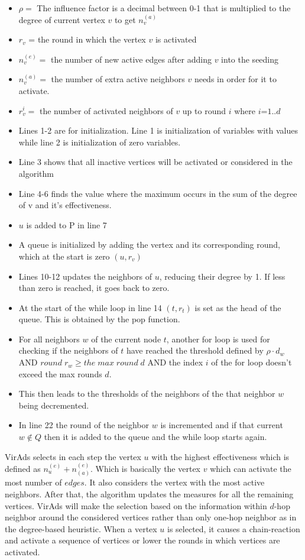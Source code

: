 \begin{itemize}
	\item $\rho =$ The influence factor is a decimal between 0-1 that is multiplied to the degree of current vertex $v$ to get $n_{v}^{(a)}$
	\item $r_{v}$ = the round in which the vertex $v$ is activated
	\item $n_{v}^{(e)}=$ the number of new active edges after adding $v$ into the seeding
	\item $n_{v}^{(a)}=$ the number of extra active neighbors $v$ needs in order for it to activate.
	\item $r_{v}^{i}=$ the number of activated neighbors of $v$ up to round $i$ where $i$=$1..d$
	\item Lines 1-2 are for initialization. Line 1 is initialization of variables with values while line 2 is initialization of zero variables.
	\item Line 3 shows that all inactive vertices will be activated or considered in the algorithm
	\item Line 4-6 finds the value where the maximum occurs in the sum of the degree of v and it's effectiveness.
	\item $u$ is added to P in line 7
	\item A queue is initialized by adding the vertex and its corresponding round, which at the start is zero $(u,r_{v})$
	\item Lines 10-12 updates the neighbors of $u$, reducing their degree by 1. If less than zero is reached, it goes back to zero.
	\item At the start of the while loop in line 14 $(t,r_{t})$ is set as the head of the queue. This is obtained by the pop function. 
	\item For all neighbors $w$ of the current node $t$, another for loop is used for checking if the neighbors of $t$ have reached the threshold defined by $\rho \cdot d_{w}$ AND $round \; r_{w} \geq the\; max\; round\; d$ AND the index $i$ of the for loop doesn't exceed the max rounds $d$.
	\item This then leads to the thresholds of the neighbors of the that neighbor $w$ being decremented.
	\item In line 22 the round of the neighbor $w$ is incremented and if that current $w \notin Q$ then it is added to the queue and the while loop starts again.
\end{itemize}
VirAds selects in each step the vertex $u$ with the highest effectiveness which is defined as $n^{(e)}_{u}+n^{(e)}_{(a)}$. Which is basically the vertex $v$ which can activate the most number of $edges$. It also considers the vertex with the most active neighbors. After that, the algorithm updates the measures for all the remaining vertices. VirAds will make the selection based on the information within $d$-hop neighbor around the considered vertices rather than only one-hop neighbor as in the degree-based heuristic. When a vertex $u$ is selected, it causes a chain-reaction and activate a sequence of vertices or lower the rounds in which vertices are activated.\cite{virads}

